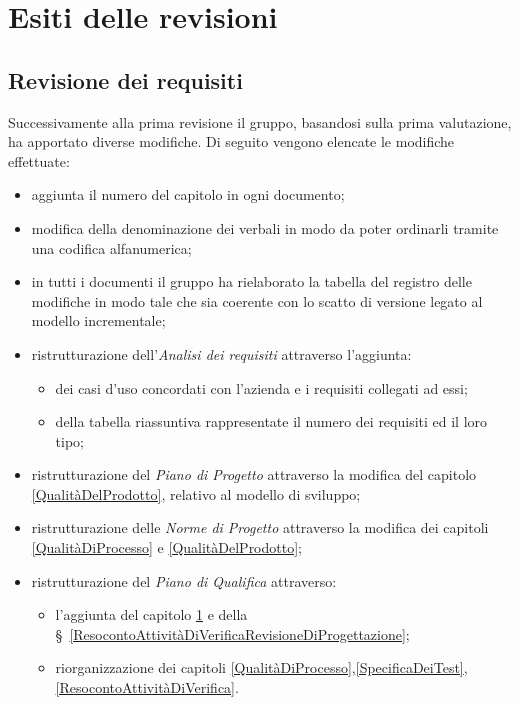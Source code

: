 \chapter{Esiti delle revisioni}\label{EsitiDelleRevisioni}

\section{Revisione dei requisiti}\label{EsitiDelleRevisioniRevisioneDeiRequisiti}

Successivamente alla prima revisione il gruppo, basandosi sulla prima valutazione, ha apportato diverse modifiche. Di seguito vengono elencate le modifiche effettuate:
\begin{itemize}
	\item aggiunta il numero del capitolo in ogni documento;
	\item modifica della denominazione dei verbali in modo da poter ordinarli tramite una codifica alfanumerica; 
	\item in tutti i documenti il gruppo ha rielaborato la tabella del registro delle modifiche in modo tale che sia coerente con lo scatto di versione legato al modello incrementale;
	\item ristrutturazione dell'\textit{Analisi dei requisiti} attraverso l'aggiunta: 
	\begin{itemize}
		\item dei casi d'uso concordati con l'azienda e i requisiti collegati ad essi;
		\item della tabella riassuntiva rappresentate il numero dei requisiti ed il loro tipo;
	\end{itemize}
	\item ristrutturazione del \textit{Piano di Progetto} attraverso la modifica del capitolo \ref{QualitàDelProdotto}, relativo al modello di sviluppo;
	\item ristrutturazione delle \textit{Norme di Progetto} attraverso la modifica dei capitoli \ref{QualitàDiProcesso} e \ref{QualitàDelProdotto};
	\item ristrutturazione del \textit{Piano di Qualifica} attraverso:
	\begin{itemize}
		\item l'aggiunta del capitolo \ref{EsitiDelleRevisioni} e della \S~\ref{ResocontoAttivitàDiVerificaRevisioneDiProgettazione};%
		\item riorganizzazione dei capitoli \ref{QualitàDiProcesso},\ref{SpecificaDeiTest},\ref{ResocontoAttivitàDiVerifica}.
	\end{itemize}
\end{itemize}

